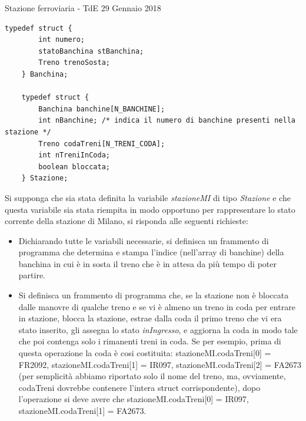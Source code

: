 \documentclass[aspectratio=169,]{beamer}
\begin{document}
\begin{frame}{Stazione ferroviaria - TdE 29 Gennaio 2018}
\begin{lstlisting}[style=CStyle, basicstyle=\small]
    typedef struct {
        int numero;
        statoBanchina stBanchina;
        Treno trenoSosta;
    } Banchina;

    typedef struct {
        Banchina banchine[N_BANCHINE];
        int nBanchine; /* indica il numero di banchine presenti nella stazione */
        Treno codaTreni[N_TRENI_CODA];
        int nTreniInCoda;
        boolean bloccata;
    } Stazione;
    \end{lstlisting}

    Si supponga che sia stata definita la variabile \emph{stazioneMI} di tipo \emph{Stazione} e che questa variabile sia stata riempita in modo opportuno per rappresentare lo stato corrente della stazione di Milano, si risponda alle seguenti richieste:
    \begin{itemize}
        \item Dichiarando tutte le variabili necessarie, si definisca un frammento di programma che determina e stampa l'indice (nell’array di banchine) della banchina in cui è in sosta il treno che è in attesa da più tempo di poter partire.
        \item Si definisca un frammento di programma che, se la stazione non è bloccata dalle manovre di qualche treno e se vi è almeno un treno in coda per entrare in stazione, blocca la stazione, estrae dalla coda il primo treno che vi era stato inserito, gli assegna lo stato \emph{inIngresso}, e aggiorna la coda in modo tale che poi contenga solo i rimanenti treni in coda. Se per esempio, prima di questa operazione la coda è cosi costituita: stazioneMI.codaTreni[0] = FR2092, stazioneMI.codaTreni[1] = IR097, stazioneMI.codaTreni[2] = FA2673 (per semplicità abbiamo riportato solo il nome del treno, ma, ovviamente, codaTreni dovrebbe contenere l’intera struct corrispondente), dopo l’operazione si deve avere che stazioneMI.codaTreni[0] = IR097, stazioneMI.codaTreni[1] = FA2673.
    \end{itemize}
\end{frame}
\end{document}
